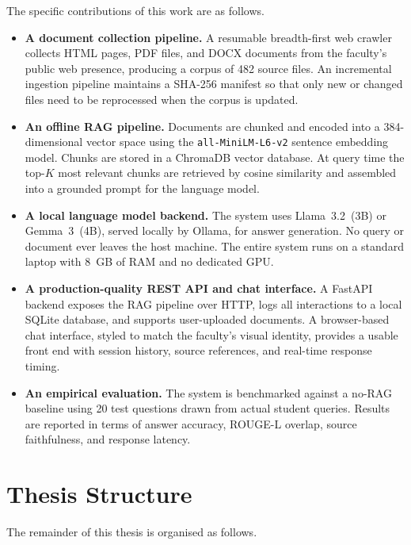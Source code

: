 The specific contributions of this work are as follows.

\begin{itemize}
  \item \textbf{A document collection pipeline.} A resumable breadth-first web crawler collects HTML pages, PDF files, and DOCX documents from the faculty's public web presence, producing a corpus of 482 source files. An incremental ingestion pipeline maintains a SHA-256 manifest so that only new or changed files need to be reprocessed when the corpus is updated.

  \item \textbf{An offline RAG pipeline.} Documents are chunked and encoded into a 384-dimensional vector space using the \texttt{all-MiniLM-L6-v2} sentence embedding model. Chunks are stored in a ChromaDB vector database. At query time the top-$K$ most relevant chunks are retrieved by cosine similarity and assembled into a grounded prompt for the language model.

  \item \textbf{A local language model backend.} The system uses Llama~3.2~(3B) or Gemma~3~(4B), served locally by Ollama, for answer generation. No query or document ever leaves the host machine. The entire system runs on a standard laptop with 8~GB of RAM and no dedicated GPU.

  \item \textbf{A production-quality REST API and chat interface.} A FastAPI backend exposes the RAG pipeline over HTTP, logs all interactions to a local SQLite database, and supports user-uploaded documents. A browser-based chat interface, styled to match the faculty's visual identity, provides a usable front end with session history, source references, and real-time response timing.

  \item \textbf{An empirical evaluation.} The system is benchmarked against a no-RAG baseline using 20 test questions drawn from actual student queries. Results are reported in terms of answer accuracy, ROUGE-L overlap, source faithfulness, and response latency.
\end{itemize}

\section{Thesis Structure}
\label{sec:intro-structure}

The remainder of this thesis is organised as follows.

